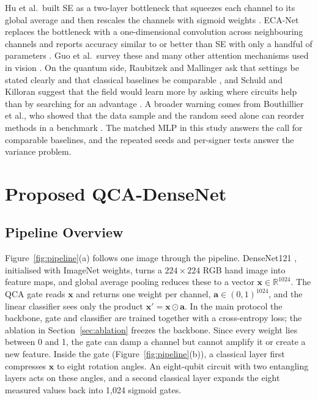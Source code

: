 \documentclass[10pt,twocolumn]{article}
\newcommand{\QCA}{QCA}
\newcommand{\vect}[1]{\mathbf{#1}}
\begin{document}
Hu et al.\ built SE as a two-layer bottleneck that squeezes each channel to
its global average and then rescales the channels with sigmoid weights
\citep{hu_2020_se}. ECA-Net replaces the bottleneck with a one-dimensional
convolution across neighbouring channels and reports accuracy similar to or
better than SE with only a handful of parameters \citep{wang_2020_eca}. Guo
et al.\ survey these and many other attention mechanisms used in vision
\citep{guo_2022_attention}. On the quantum side, Raubitzek and Mallinger
ask that settings be stated clearly and that classical baselines be
comparable \citep{raubitzek_2023_applicability}, and Schuld and Killoran
suggest that the field would learn more by asking where circuits help than
by searching for an advantage \citep{schuld_2022_advantage}. A broader
warning comes from Bouthillier et al., who showed that the data sample and
the random seed alone can reorder methods in a benchmark
\citep{bouthillier_2021_variance}. The matched MLP in this study answers the
call for comparable baselines, and the repeated seeds and per-signer tests
answer the variance problem.

\section{Proposed QCA-DenseNet}
\label{sec:method}

\subsection{Pipeline Overview}

Figure~\ref{fig:pipeline}(a) follows one image through the pipeline.
DenseNet121 \citep{huang_2022_densenet}, initialised with ImageNet weights,
turns a $224\times224$ RGB hand image into feature maps, and global average
pooling reduces these to a vector $\vect{x}\in\mathbb{R}^{1024}$. The \QCA{}
gate reads $\vect{x}$ and returns one weight per channel,
$\vect{a}\in(0,1)^{1024}$, and the linear classifier sees only the product
$\vect{x}'=\vect{x}\odot\vect{a}$. In the main protocol the backbone, gate
and classifier are trained together with a cross-entropy loss; the ablation
in Section~\ref{sec:ablation} freezes the backbone. Since every weight lies
between 0 and 1, the gate can damp a channel but cannot amplify it or create
a new feature. Inside the gate (Figure~\ref{fig:pipeline}(b)), a classical
layer first compresses $\vect{x}$ to eight rotation angles. An eight-qubit
circuit with two entangling layers acts on these angles, and a second
classical layer expands the eight measured values back into 1,024 sigmoid
gates.
\end{document}
